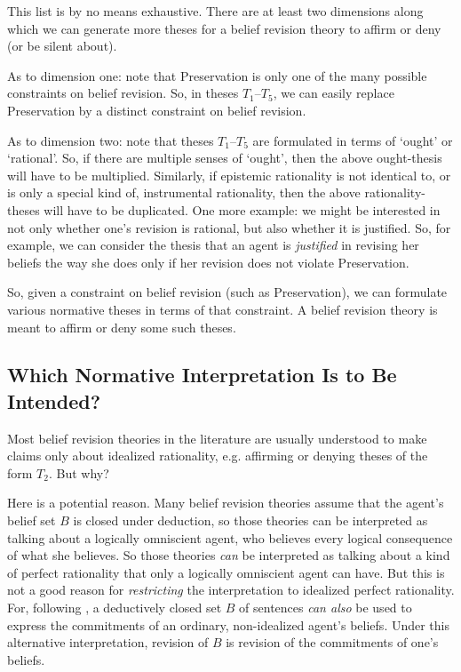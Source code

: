 This list is by no means exhaustive. There are at least two dimensions along which we can generate more theses for a belief revision theory to affirm or deny (or be silent about). 

As to dimension one: note that Preservation is only one of the many possible constraints on belief revision. So, in theses $T_1$--$T_5$, we can easily replace Preservation by a distinct constraint on belief revision. 

As to dimension two: note that theses $T_1$--$T_5$ are formulated in terms of `ought' or `rational'. So, if there are multiple senses of `ought', then the above ought-thesis will have to be multiplied. Similarly, if epistemic rationality is not identical to, or is only a special kind of, instrumental rationality, then the above rationality-theses will have to be duplicated. One more example: we might be interested in not only whether one's revision is rational, but also whether it is justified. So, for example, we can consider the thesis that an agent is {\em justified} in revising her beliefs the way she does only if her revision does not violate Preservation. 

So, given a constraint on belief revision (such as Preservation), we can formulate various normative theses in terms of that constraint. A belief revision theory is meant to affirm or deny some such theses.

\subsection{Which Normative Interpretation Is to Be Intended?}\label{sec-choosing-interpretations}

Most belief revision theories in the literature are usually understood to make claims only about idealized rationality, e.g. affirming or denying theses of the form $T_2$. But why? 

Here is a potential reason. Many belief revision theories assume that the agent's belief set $B$ is closed under deduction, so those theories can be interpreted as talking about a logically omniscient agent, who believes every logical consequence of what she believes. So those theories {\em can} be interpreted as talking about a kind of perfect rationality that only a logically omniscient agent can have. But this is not a good reason for {\em restricting} the interpretation to idealized perfect rationality. For, following \citet{levi1983enterprise}, a deductively closed set $B$ of sentences {\em can also} be used to express the commitments of an ordinary, non-idealized agent's beliefs. Under this alternative interpretation, revision of $B$ is revision of the commitments of one's beliefs. 

